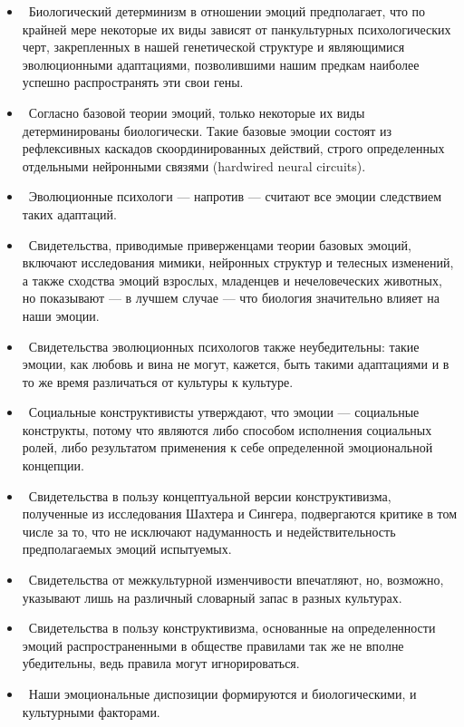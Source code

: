 \documentclass[11pt]{book}
\begin{document}
\begin{itemize}
  \item\ Биологический детерминизм в отношении эмоций предполагает, что по крайней мере некоторые их виды зависят от панкультурных психологических черт, закрепленных в нашей генетической структуре и являющимися эволюционными адаптациями, позволившими нашим предкам наиболее успешно распространять эти свои гены.
  \item\ Согласно базовой теории эмоций, только некоторые их виды детерминированы биологически. Такие базовые эмоции состоят из рефлексивных каскадов скоординированных действий, строго определенных отдельными нейронными связями (hardwired neural circuits).
  \item\ Эволюционные психологи --- напротив --- считают все эмоции следствием таких адаптаций.
  \item\ Свидетельства, приводимые приверженцами теории базовых эмоций, включают исследования мимики, нейронных структур и телесных изменений, а также сходства эмоций взрослых, младенцев и нечеловеческих животных, но показывают --- в лучшем случае --- что биология значительно влияет на наши эмоции.
  \item\ Свидетельства эволюционных психологов также неубедительны: такие эмоции, как любовь и вина не могут, кажется, быть такими адаптациями и в то же время различаться от культуры к культуре.
  \item\ Социальные конструктивисты утверждают, что эмоции --- социальные конструкты, потому что являются либо способом исполнения социальных ролей, либо результатом применения к себе определенной эмоциональной концепции.
  \item\ Свидетельства в пользу концептуальной версии конструктивизма, полученные из исследования Шахтера и Сингера, подвергаются критике в том числе за то, что не исключают надуманность и недействительность предполагаемых эмоций испытуемых.
  \item\ Свидетельства от межкультурной изменчивости впечатляют, но, возможно, указывают лишь на различный словарный запас в разных культурах.
  \item\ Свидетельства в пользу конструктивизма, основанные на определенности эмоций распространенными в обществе правилами так же не вполне убедительны, ведь правила могут игнорироваться.
  \item\ Наши эмоциональные диспозиции формируются и биологическими, и культурными факторами.
\end{itemize}
\end{document}
